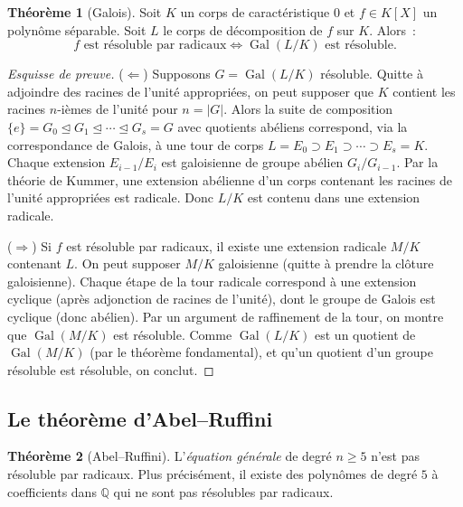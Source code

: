 \documentclass[12pt,a4paper,openany]{book}
\theoremstyle{definition}
\newtheorem{theoreme}{Théorème}[chapter]
\newcommand{\Q}{\mathbb{Q}}
\newcommand{\Gal}{\operatorname{Gal}}
\begin{document}
\begin{theoreme}[Galois]\label{thm:galois-resolubilite}
Soit $K$ un corps de caractéristique $0$ et $f \in K[X]$ un polynôme
séparable. Soit $L$ le corps de décomposition de $f$ sur $K$. Alors~:
\[
  f \text{ est résoluble par radicaux} \iff \Gal(L/K) \text{ est résoluble}.
\]
\end{theoreme}

\begin{proof}[Esquisse de preuve]
($\Leftarrow$) Supposons $G = \Gal(L/K)$ résoluble. Quitte à adjoindre des
racines de l'unité appropriées, on peut supposer que $K$ contient les racines
$n$-ièmes de l'unité pour $n = |G|$. Alors la suite de composition
$\{e\} = G_0 \trianglelefteq G_1 \trianglelefteq \cdots \trianglelefteq
G_s = G$ avec quotients abéliens correspond, via la correspondance de Galois,
à une tour de corps
$L = E_0 \supset E_1 \supset \cdots \supset E_s = K$.
Chaque extension $E_{i-1}/E_i$ est galoisienne de groupe abélien $G_i/G_{i-1}$.
Par la théorie de Kummer, une extension abélienne
d'un corps contenant les racines de l'unité appropriées est radicale.
Donc $L/K$ est contenu dans une extension radicale.

($\Rightarrow$) Si $f$ est résoluble par radicaux, il existe une extension
radicale $M/K$ contenant $L$. On peut supposer $M/K$ galoisienne (quitte à
prendre la clôture galoisienne). Chaque étape de la tour radicale correspond
à une extension cyclique (après adjonction de racines de l'unité), dont le
groupe de Galois est cyclique (donc abélien). Par un argument de raffinement
de la tour, on montre que $\Gal(M/K)$ est résoluble. Comme $\Gal(L/K)$ est
un quotient de $\Gal(M/K)$ (par le théorème fondamental), et qu'un quotient
d'un groupe résoluble est résoluble, on conclut.
\end{proof}

\subsection{Le théorème d'Abel--Ruffini}\label{ssec:abel-ruffini}

\begin{theoreme}[Abel--Ruffini]\label{thm:abel-ruffini}
L'\emph{équation générale} de degré $n \geq 5$ n'est pas résoluble par
radicaux. Plus précisément, il existe des polynômes de degré $5$ à
coefficients dans $\Q$ qui ne sont pas résolubles par radicaux.
\end{theoreme}
\end{document}

